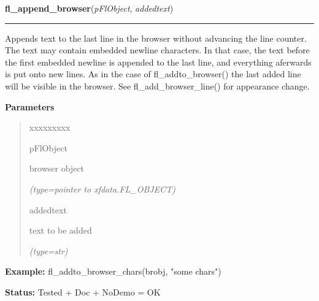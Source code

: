     \vspace{0.5ex}

\hspace{.8\funcindent}\begin{boxedminipage}{\funcwidth}

    \raggedright \textbf{fl\_append\_browser}(\textit{pFlObject}, \textit{addedtext})

    \vspace{-1.5ex}

    \rule{\textwidth}{0.5\fboxrule}
\setlength{\parskip}{2ex}
    Appends text to the last line in the browser without advancing the line
    counter. The text may contain embedded newline characters. In that 
    case, the text before the first embedded newline is appended to the 
    last line, and everything aferwards is put onto new lines. As in the 
    case of fl\_addto\_browser() the last added line will be visible in the
    browser. See fl\_add\_browser\_line() for appearance change.

\setlength{\parskip}{1ex}
      \textbf{Parameters}
      \vspace{-1ex}

      \begin{quote}
        \begin{Ventry}{xxxxxxxxx}

          \item[pFlObject]

          browser object

            {\it (type=pointer to xfdata.FL\_OBJECT)}

          \item[addedtext]

          text to be added

            {\it (type=str)}

        \end{Ventry}

      \end{quote}

\textbf{Example:} fl\_addto\_browser\_chars(brobj, "some chars")



\textbf{Status:} Tested + Doc + NoDemo = OK



    \end{boxedminipage}

    \label{xformslib:flbrowser:fl_insert_browser_line}

